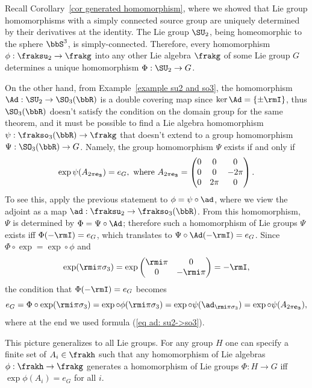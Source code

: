 \begin{example}
    Recall Corollary~\ref{cor generated homomorphism}, where we showed that Lie group homomorphisms with a simply connected source group are uniquely determined by their derivatives at the identity. The Lie group $\SU_2$, being homeomorphic to the sphere $\bbS^3$, is simply-connected. Therefore, every homomorphism $\phi:\fraksu_2\to\frakg$ into any other Lie algebra $\frakg$ of some Lie group $G$ determines a unique homomorphism $\Phi:\SU_2\to G$. 
    
    On the other hand, from Example~\ref{example su2 and so3}, the homomorphism $\Ad:\SU_2\to \SO_3(\bbR)$ is a double covering map since $\ker\Ad=\{\pm \rmI\}$, thus $\SO_3(\bbR)$ doesn't satisfy the condition on the domain group for the same theorem, and it must be possible to find a Lie algebra homomorphism $\psi:\frakso_3(\bbR)\to\frakg$ that doesn't extend to a group homomorphism $\Psi:\SO_3(\bbR)\to G$. Namely, the group homomorphism $\Psi$ exists if and only if 
    \[\exp \psi(A_{2\pi \bf{e}_3})=e_G,\text{ where }A_{2\pi \bf{e}_3}=
    \begin{pmatrix}
        0&0&0\\
        0&0&-2\pi\\
        0&2\pi &0
    \end{pmatrix}.
    \]
    To see this, apply the previous statement to $\phi=\psi\circ\ad$, where we view the adjoint as a map $\ad:\fraksu_2\to\frakso_3(\bbR)$. From this homomorphism, $\Psi$ is determined by $\Phi=\Psi\circ \Ad$; therefore such a homomorphism of Lie groups $\Psi$ exists iff $\Phi(-\rmI)=e_G$, which translates to $\Psi\circ \Ad(-\rmI)=e_G$. Since $\Phi\circ\exp=\exp\circ\phi$ and 
    \[\exp(\rmi \pi\sigma_3)=\exp \begin{pmatrix}
        \rmi \pi&0\\0 &-\rmi \pi
    \end{pmatrix}=-\rmI,\]
    the condition that $\Phi(-\rmI)=e_G$ becomes
    \[e_G=\Phi\circ \exp (\rmi\pi\sigma_3)=\exp\circ\phi (\rmi\pi\sigma_3)=\exp\circ\psi( \ad_{\rmi\pi\sigma_3})=\exp\circ\psi (A_{2\pi \bf{e}_3}),\]
    where at the end we used formula (\ref{eq ad: su2->so3}).
    
    This picture generalizes to all Lie groups. For any group $H$ one can specify a finite set of $A_i\in\frakh$ such that any homomorphism of Lie algebras $\phi:\frakh\to\frakg$ generates a homomorphism of Lie groups $\Phi:H\to G$ iff $\exp\phi(A_i)=e_G$ for all $i$.
\end{example}


